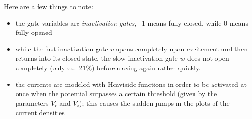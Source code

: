 Here are a few things to note:
\begin{itemize}
    \item the gate variables are \emph{inactivation gates}, \ie~1 means fully
        closed, while 0 means fully opened
    \item while the fast inactivation gate $v$ opens completely upon
        excitement and then returns into its closed state, the
        slow inactivation gate $w$ does not open completely (only ca.~21\%)
        before closing again rather quickly.
    \item the currents are modeled with Heaviside-functions in order to be
        activated at once when the potential surpasses a certain threshold
        (given by the parameters $V_c$ and $V_v$); this causes the sudden jumps
        in the plots of the current densities
\end{itemize}


